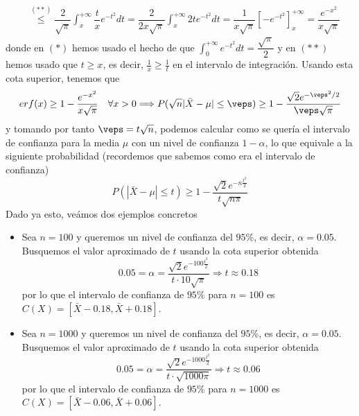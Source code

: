 \begin{ejemplo}
\begin{align}
        & \overset{(**)}{\leq} \dfrac{2}{\sqrt{\pi}} \int_{x}^{+\infty} \dfrac{t}{x} e^{-t^2} dt = \dfrac{2}{2x\sqrt{\pi}} \int_{x}^{+\infty} 2t e^{-t^2} dt = \dfrac{1}{x\sqrt{\pi}} \left[ -e^{-t^2} \right]_{x}^{+\infty} = \dfrac{e^{-x^2}}{x\sqrt{\pi}} \nonumber
    \end{align}
    donde en $(*)$ hemos usado el hecho de que $\int_{0}^{+\infty} e^{-t^2} dt = \dfrac{\sqrt{\pi}}{2}$ y en $(**)$ hemos usado que $t\geq x$, es decir, $\frac{1}{x}\geq \frac{1}{t}$ en el intervalo de integración. Usando esta cota superior, tenemos que
    \begin{equation*}
        erf(x)\geq 1- \dfrac{e^{-x^2}}{x\sqrt{\pi}} \quad \forall x>0 \Longrightarrow P(\sqrt{n}|\bar{X} - \mu| \leq \veps) \geq 1 - \dfrac{\sqrt{2} e^{-\veps^2/2}}{\veps \sqrt{\pi}}
    \end{equation*}
    y tomando por tanto $\veps =t\sqrt{n}$, podemos calcular como se quería el intervalo de confianza para la media $\mu$ con un nivel de confianza $1-\alpha$, lo que equivale a la siguiente probabilidad (recordemos que sabemos como era el intervalo de confianza)
    \begin{equation*}
        P(|\bar{X} - \mu| \leq t) \geq 1 - \dfrac{\sqrt{2} e^{-n \frac{t^2}{2}}}{t \sqrt{n\pi}}
    \end{equation*}
    Dado ya esto, veámos dos ejemplos concretos
    \begin{itemize}
        \item Sea $n=100$ y queremos un nivel de confianza del $95\%$, es decir, $\alpha = 0.05$. Busquemos el valor aproximado de $t$ usando la cota superior obtenida
        \begin{equation*}
            0.05=\alpha=\dfrac{\sqrt{2} e^{-100 \frac{t^2}{2}}}{t \cdot 10 \sqrt{\pi}} \Longrightarrow t  \approx 0.18
        \end{equation*}
        por lo que el intervalo de confianza de $95\%$ para $n=100$ es $C(X) = [\bar{X} - 0.18, \bar{X} + 0.18]$.
        \item Sea $n=1000$ y queremos un nivel de confianza del $95\%$, es decir, $\alpha = 0.05$. Busquemos el valor aproximado de $t$ usando la cota superior obtenida
        \begin{equation*}
            0.05=\alpha=\dfrac{\sqrt{2} e^{-1000 \frac{t^2}{2}}}{t \cdot \sqrt{1000\pi}} \Longrightarrow t  \approx 0.06
        \end{equation*}
        por lo que el intervalo de confianza de $95\%$ para $n=1000$ es $C(X) = [\bar{X} - 0.06, \bar{X} + 0.06]$.
    \end{itemize}
\end{ejemplo}

